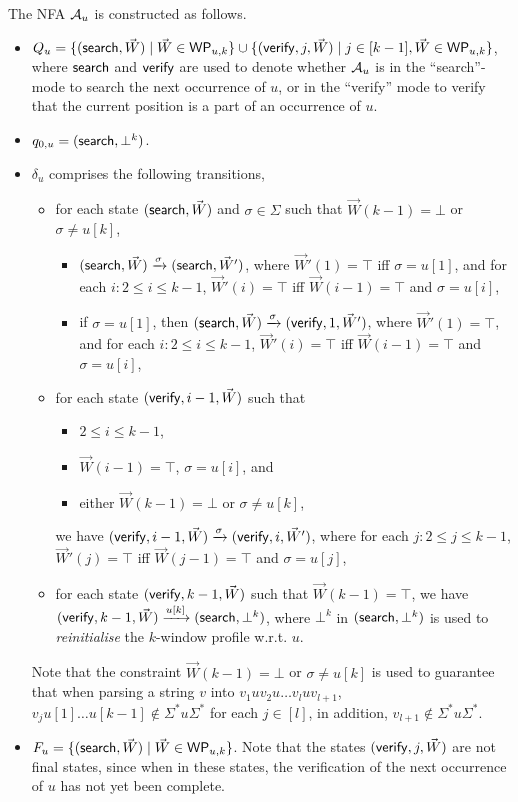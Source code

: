 \documentclass{llncs}
\begin{document}
The NFA $\mathcal{A}_u$ is constructed as follows.
\begin{itemize}
\item  $Q_u = \{(\mathsf{search}, \vec{W}) \mid \vec{W} \in \mathsf{WP}_{u, k}\} \cup \{(\mathsf{verify}, j, \vec{W}) \mid j \in [k-1], \vec{W} \in \mathsf{WP}_{u,k}\}$, where $\mathsf{search}$ and $\mathsf{verify}$ are used to denote whether $\mathcal{A}_u$ is in the ``search''-mode to search the next occurrence of $u$, or in the ``verify'' mode to verify that the current position is a part of an occurrence of $u$.
%
\item $q_{0,u}=(\mathsf{search},\bot^k)$.

\item $\delta_{u}$ comprises the following transitions,
\begin{itemize}
\item for each state $(\mathsf{search}, \vec{W})$ and $\sigma \in \Sigma$ such that $\vec{W}(k-1) = \bot$ or $\sigma \neq u[k]$,
\begin{itemize}
\item $(\mathsf{search}, \vec{W}) \xrightarrow{\sigma} (\mathsf{search}, \vec{W}')$, where $\vec{W}'(1) = \top$ iff $\sigma = u[1]$, and for each $i: 2 \le i \le k-1$, $\vec{W}'(i) =\top$ iff $\vec{W}({i-1}) = \top$ and $\sigma = u[i]$,
%
\item if $\sigma = u[1]$, then $(\mathsf{search}, \vec{W}) \xrightarrow{\sigma} (\mathsf{verify}, 1, \vec{W}')$,  where $\vec{W}'(1)=\top$,  and for each $i: 2 \le i \le k-1$, $\vec{W}'(i) =\top$ iff $\vec{W}({i-1}) = \top$ and $\sigma = u[i]$,
%
\end{itemize}
%
\item for each state $(\mathsf{verify}, i-1, \vec{W})$ such that
\begin{itemize}
\item $2 \le i \le k-1$,
\item $\vec{W}(i-1)=\top$, $\sigma = u[i]$, and
\item either $\vec{W}(k-1)=\bot$ or $\sigma \neq u[k]$, 
\end{itemize}
we have $(\mathsf{verify}, i-1, \vec{W}) \xrightarrow{\sigma} (\mathsf{verify}, i, \vec{W}')$, where for each $j: 2 \le j \le k-1$, $\vec{W}'(j) = \top$ iff $\vec{W}(j-1)=\top$ and $\sigma = u[j]$, 
%
\item for each state $(\mathsf{verify}, k-1, \vec{W})$ such that $\vec{W}(k-1)=\top$, we have $(\mathsf{verify}, k-1, \vec{W}) \xrightarrow{u[k]} (\mathsf{search}, \bot^k)$, where $\bot^k$ in $(\mathsf{search}, \bot^k)$ is used to \emph{reinitialise} the $k$-window profile w.r.t. $u$.
%
\end{itemize}
Note that the constraint $\vec{W}(k-1) = \bot$ or $\sigma \neq u[k]$ is used to guarantee that when parsing a string $v$ into $v_1 u v_2 u \dots v_{l} u v_{l+1}$, $v_j u[1] \dots u[k-1] \not \in \Sigma^\ast u \Sigma^\ast$ for each $j \in [l]$, in addition, $v_{l+1} \not \in  \Sigma^\ast u \Sigma^\ast$.
%
\item $F_u=\{(\mathsf{search}, \vec{W}) \mid \vec{W} \in \mathsf{WP}_{u, k} \} $. Note that the states $(\mathsf{verify}, j, \vec{W})$ are not final states, since when in these states, the verification of the next occurrence of $u$ has not yet been complete.
\end{itemize}
\end{document}
